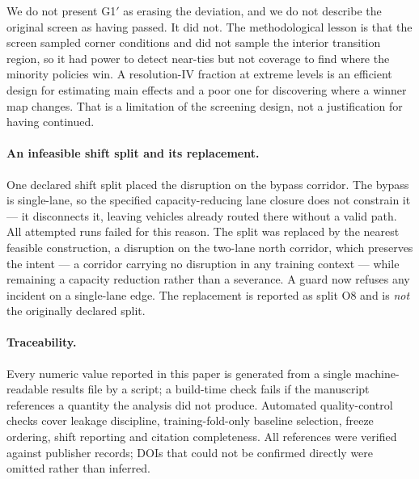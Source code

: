 We do not present G1$'$ as erasing the deviation, and we do not describe the
original screen as having passed. It did not. The methodological lesson is that
the screen sampled corner conditions and did not sample the interior transition
region, so it had power to detect near-ties but not coverage to find where the
minority policies win. A resolution-IV fraction at extreme levels is an
efficient design for estimating main effects and a poor one for discovering
where a winner map changes. That is a limitation of the screening design, not a
justification for having continued.

\paragraph{An infeasible shift split and its replacement.} One declared shift
split placed the disruption on the bypass corridor. The bypass is single-lane,
so the specified capacity-reducing lane closure does not constrain it --- it
disconnects it, leaving vehicles already routed there without a valid path. All
\NumRunsFailedBypass{} attempted runs failed for this reason. The split was
replaced by the nearest feasible construction, a disruption on the two-lane
north corridor, which preserves the intent --- a corridor carrying no disruption
in any training context --- while remaining a capacity reduction rather than a
severance. A guard now refuses any incident on a single-lane edge. The
replacement is reported as split O8 and is \emph{not} the originally declared
split.

\paragraph{Traceability.} Every numeric value reported in this paper is
generated from a single machine-readable results file by a script; a build-time
check fails if the manuscript references a quantity the analysis did not
produce. Automated quality-control checks cover leakage discipline,
training-fold-only baseline selection, freeze ordering, shift reporting and
citation completeness. All \NumRefs{} references were verified against publisher
records; DOIs that could not be confirmed directly were omitted rather than
inferred.
